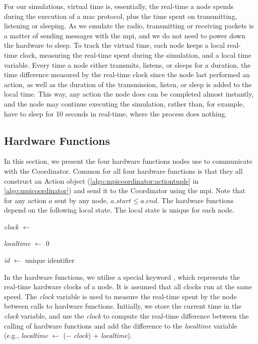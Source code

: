 For our simulations, virtual time is, essentially, the real-time a node spends during the execution of a
\gls{mac} protocol, plus the time spent on transmitting, listening or sleeping. As we emulate the radio,
transmitting or receiving packets is a matter of sending messages with the \gls{mpi}, and we do not need to
power down the hardware to sleep. To track the virtual time, each node keeps a local real-time clock,
measuring the real-time spent during the simulation, and a local time variable. Every time a node either
transmits, listens, or sleeps for a duration, the time difference measured by the real-time clock since the
node last performed an action, as well as the duration of the transmission, listen, or sleep is added to the
local time. This way, any action the node does can be completed almost instantly, and the node may continue
executing the simulation, rather than, for example, have to sleep for 10 seconds in real-time, where the
process does nothing.

\subsection{Hardware Functions}\label{sec:hwfuncspseudo}
In this section, we present the four hardware functions nodes use to communicate with the Coordinator. Common
for all four hardware functions is that they all construct an Action object
(\autoref{algo:mpicoordinator:actiontuple} in \autoref{algo:mpicoordinator}) and send it to the Coordinator
using the \gls{mpi}. Note that for any action $a$ sent by any node, $a.\mathit{start} \leq a.\mathit{end}$.
The hardware functions depend on the following local state. The local state is unique for each node.
\smallbreak

\textit{clock} $\leftarrow$ \KwNow

\textit{localtime} $\leftarrow$ 0

\textit{id} $\leftarrow$ unique identifier \smallbreak

In the hardware functions, we utilise a special keyword \KwNow, which represents the real-time hardware clocks
of a node. It is assumed that all clocks run at the same speed. The \textit{clock} variable is used to measure
the real-time spent by the node between calls to hardware functions. Initially, we store the current time in
the \textit{clock} variable, and use the \textit{clock} to compute the real-time difference between the
calling of hardware functions and add the difference to the \textit{localtime} variable (e.g.,
\textit{localtime} $\leftarrow$ (\KwNow $-$ \textit{clock}) $+$ \textit{localtime}).


